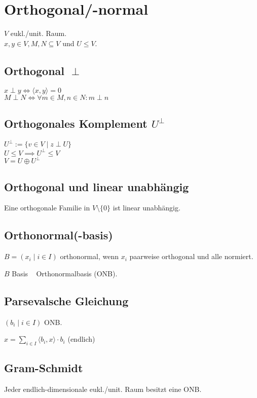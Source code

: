 \section*{Orthogonal/-normal}
$V$ eukl./unit. Raum. \\
$x,y\in V,M,N\subseteq V$ und $U \le V$.

\subsection*{Orthogonal $\perp$}
$x\perp y \iff \langle x,y \rangle = 0$ \\
$M \perp N \iff \forall m\in M, n\in N: m \perp n$

\subsection*{Orthogonales Komplement $U^\perp$}
$U^\perp := \{v \in V \mid z \perp U\}$ \\
$U \le V \implies U^\perp \le V$ \\
$V = U \oplus U^\perp$

\subsection*{Orthogonal und linear unabhängig}
Eine orthogonale Familie in $V\setminus\{0\}$ ist linear unabhängig.

\subsection*{Orthonormal(-basis)}
$B=(x_i \mid i\in I)$ orthonormal, wenn
$x_i$ paarweise orthogonal und alle normiert.

$B$ Basis \rightarrow~ Orthonormalbasis (ONB).

\subsection*{Parsevalsche Gleichung}
$(b_i \mid i\in I)$ ONB.

$\displaystyle x=\sum_{i\in I}\langle b_i,x \rangle\cdot b_i$ (endlich)

\subsection*{Gram-Schmidt}
Jeder endlich-dimensionale eukl./unit. Raum besitzt eine ONB.


